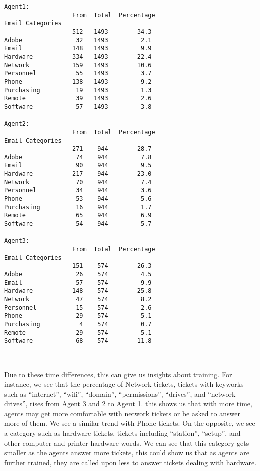 \documentclass[11pt]{article}
\begin{document}
    \begin{Verbatim}[commandchars=\\\{\}]
Agent1:
                   From  Total  Percentage
Email Categories
                   512   1493        34.3
Adobe               32   1493         2.1
Email              148   1493         9.9
Hardware           334   1493        22.4
Network            159   1493        10.6
Personnel           55   1493         3.7
Phone              138   1493         9.2
Purchasing          19   1493         1.3
Remote              39   1493         2.6
Software            57   1493         3.8

Agent2:
                   From  Total  Percentage
Email Categories
                   271    944        28.7
Adobe               74    944         7.8
Email               90    944         9.5
Hardware           217    944        23.0
Network             70    944         7.4
Personnel           34    944         3.6
Phone               53    944         5.6
Purchasing          16    944         1.7
Remote              65    944         6.9
Software            54    944         5.7

Agent3:
                   From  Total  Percentage
Email Categories
                   151    574        26.3
Adobe               26    574         4.5
Email               57    574         9.9
Hardware           148    574        25.8
Network             47    574         8.2
Personnel           15    574         2.6
Phone               29    574         5.1
Purchasing           4    574         0.7
Remote              29    574         5.1
Software            68    574        11.8
    \end{Verbatim}


    \begin{center}
    \end{center}
    { \hspace*{\fill} \\}
    
    Due to these time differences, this can give us insights about training.
For instance, we see that the percentage of Network tickets, tickets
with keyworks such as ``internet'', ``wifi'', ``domain'',
``permissions'', ``drives'', and ``network drives'', rises from Agent 3
and 2 to Agent 1. this shows us that with more time, agents may get more
comfortable with network tickets or be asked to answer more of them. We
see a similar trend with Phone tickets. On the opposite, we see a
category such as hardware tickets, tickets including ``station'',
``setup'', and other computer and printer hardware words. We can see
that this category gets smaller as the agents answer more tickets, this
could show us that as agents are further trained, they are called upon
less to answer tickets dealing with hardware.
\end{document}
